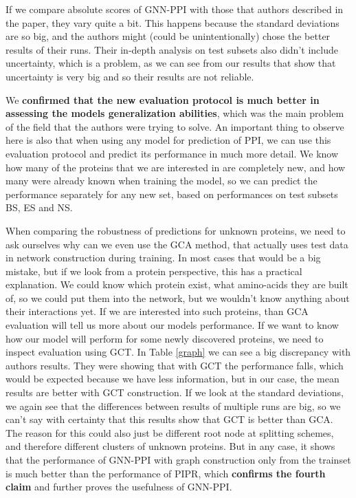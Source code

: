 If we compare absolute scores of GNN-PPI with those that authors described in the paper, they vary quite a bit. This happens because the standard deviations are so big, and the authors might (could be unintentionally) chose the better results of their runs. Their in-depth analysis on test subsets also didn't include uncertainty, which is a problem, as we can see from our results that show that uncertainty is very big and so their results are not reliable.

We \textbf{confirmed that the new evaluation protocol is much better in assessing the models generalization abilities}, which was the main problem of the field that the authors were trying to solve. 
An important thing to observe here is also that when using any model for prediction of PPI, we can use this evaluation protocol and predict its performance in much more detail. We know how many of the proteins that we are interested in are completely new, and how many were already known when training the model, so we can predict the performance separately for any new set, based on performances on test subsets BS, ES and NS.

When comparing the robustness of predictions for unknown proteins, we need to ask ourselves why can we even use the GCA method, that actually uses test data in network construction during training. In most cases that would be a big mistake, but if we look from a protein perspective, this has a practical explanation. We could know which protein exist, what amino-acids they are built of, so we could put them into the network, but we wouldn't know anything about their interactions yet. If we are interested into such proteins, than GCA evaluation will tell us more about our models performance. If we want to know how our model will perform for some newly discovered proteins, we need to inspect evaluation using GCT.
In Table \ref{graph} we can see a big discrepancy with authors results. They were showing that with GCT the performance falls, which would be expected because we have less information, but in our case, the mean results are better with GCT construction. If we look at the standard deviations, we again see that the differences between results of multiple runs are big, so we can't say with certainty that this results show that GCT is better than GCA. The reason for this could also just be different root node at splitting schemes, and therefore different clusters of unknown proteins. But in any case, it shows that the performance of GNN-PPI with graph construction only from the trainset is much better than the performance of PIPR, which \textbf{confirms the fourth claim} and further proves the usefulness of GNN-PPI.


